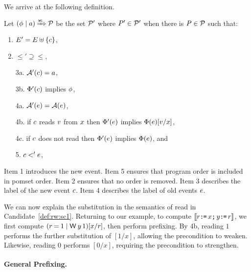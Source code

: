 We arrive at the following definition.
\begin{definition}
  \label{def:pre-sc}
Let $(\phi \mid a) \mathbin{\smash{\xRightarrow{\mathsf{sc}}}} \mathcal{P}$ be the set $\mathcal{P}'$ where $P'\in\mathcal{P}'$ when
there is $P\in\mathcal{P}$ such that:
\begin{enumerate}
\item\label{pre-E} $E' = E \uplus \{c\}$,
\item\label{pre-le} ${\le'}\supseteq{\le}$, %
\item[3a.] $\mathcal{A}'(c) = a$,
\item[3b.] $\Phi'(c)$ implies $\phi$,
\item[4a.] $\mathcal{A}'(e) = \mathcal{A}(e)$,
\item[4b.] if $c$ \externally reads $v$ from $x$ then
  $\Phi'(e)$ implies $\Phi(e)[v/x]$,
\item[4c.] if $c$ does not \externally read then
  $\Phi'(e)$ implies $\Phi(e)$, and
\item[5.] $c <' e$, 
\end{enumerate}
\end{definition}
Item 1 introduces the new event.  Item 5 ensures that program order is included in
pomset order.  Item 2 ensures that no order is removed.  Item 3 describes the
label of the new event $c$.  Item 4 describes the label of old events
$e$.

We can now explain the substitution in the semantics of read in Candidate~\ref{def:rw:sc1}.
Returning to our example, to compute
$\llbracket r\texttt{:}\mkern-1mu\texttt{=}\, x\texttt{;}\,\allowbreak y\texttt{:}\mkern-1mu\texttt{=}\, r\rrbracket$, we first compute
$(r\EQ1\mid\DW{y}{1})[x/r]$, then perform prefixing.  By 4b, reading $1$
performs the further substitution of $[1/x]$, allowing the precondition to
weaken.  Likewise, reading $0$ performs $[0/x]$, requiring the precondition
to strengthen.

\paragraph{General Prefixing.}

